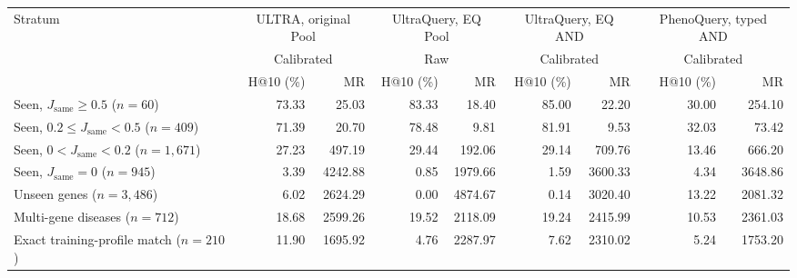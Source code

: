 \begin{landscape}
\begin{table}[tb]
\begin{adjustbox}{max width=\linewidth}
\begin{tabular}{lrrrrrrrr}
\midrule
Stratum & \multicolumn{2}{c}{ULTRA, original Pool} & \multicolumn{2}{c}{UltraQuery, EQ Pool} & \multicolumn{2}{c}{UltraQuery, EQ AND} & \multicolumn{2}{c}{PhenoQuery, typed AND} \\
 & \multicolumn{2}{c}{Calibrated} & \multicolumn{2}{c}{Raw} & \multicolumn{2}{c}{Calibrated} & \multicolumn{2}{c}{Calibrated} \\
 & H@10 (\%) & MR & H@10 (\%) & MR & H@10 (\%) & MR & H@10 (\%) & MR \\
\midrule
Seen, $J_{\mathrm{same}}\geq0.5$ ($n=60$) & 73.33 & 25.03 & 83.33 & 18.40 & 85.00 & 22.20 & 30.00 & 254.10 \\
Seen, $0.2\leq J_{\mathrm{same}}<0.5$ ($n=409$) & 71.39 & 20.70 & 78.48 & 9.81 & 81.91 & 9.53 & 32.03 & 73.42 \\
Seen, $0<J_{\mathrm{same}}<0.2$ ($n=1{,}671$) & 27.23 & 497.19 & 29.44 & 192.06 & 29.14 & 709.76 & 13.46 & 666.20 \\
Seen, $J_{\mathrm{same}}=0$ ($n=945$) & 3.39 & 4242.88 & 0.85 & 1979.66 & 1.59 & 3600.33 & 4.34 & 3648.86 \\
Unseen genes ($n=3{,}486$) & 6.02 & 2624.29 & 0.00 & 4874.67 & 0.14 & 3020.40 & 13.22 & 2081.32 \\
Multi-gene diseases ($n=712$) & 18.68 & 2599.26 & 19.52 & 2118.09 & 19.24 & 2415.99 & 10.53 & 2361.03 \\
Exact training-profile match ($n=210$) & 11.90 & 1695.92 & 4.76 & 2287.97 & 7.62 & 2310.02 & 5.24 & 1753.20 \\
\bottomrule
\end{tabular}
\end{adjustbox}
\end{table}
\end{landscape}
